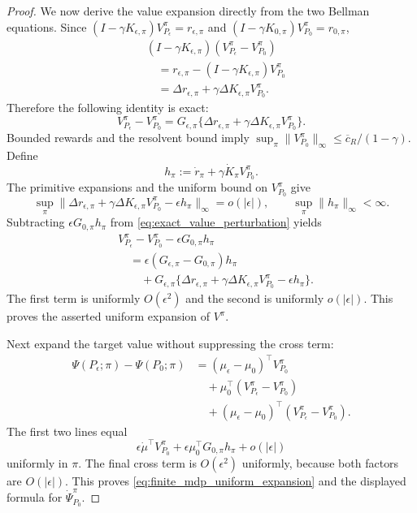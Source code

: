 \documentclass[12pt]{article}
\theoremstyle{remark}\newtheorem{remark}[theorem]{Remark}\theoremstyle{plain}
\begin{document}
\begin{proof}
    We now derive the value expansion directly from the two Bellman
    equations.  Since
    $(I-\gamma K_{\epsilon,\pi})V_{P_\epsilon}^\pi
      =r_{\epsilon,\pi}$ and
    $(I-\gamma K_{0,\pi})V_{P_0}^\pi=r_{0,\pi}$,
    \[
        \begin{aligned}
        &(I-\gamma K_{\epsilon,\pi})
        (V_{P_\epsilon}^\pi-V_{P_0}^\pi)\\
        &\quad=
        r_{\epsilon,\pi}
        -(I-\gamma K_{\epsilon,\pi})V_{P_0}^\pi\\
        &\quad=
        \Delta r_{\epsilon,\pi}
        +\gamma\Delta K_{\epsilon,\pi}V_{P_0}^\pi.
        \end{aligned}
    \]
    Therefore the following identity is exact:
    \begin{equation}\label{eq:exact_value_perturbation}
        V_{P_\epsilon}^\pi-V_{P_0}^\pi
        =
        G_{\epsilon,\pi}
        \{\Delta r_{\epsilon,\pi}
        +\gamma\Delta K_{\epsilon,\pi}V_{P_0}^\pi\}.
    \end{equation}
    Bounded rewards and the resolvent bound imply
    $\sup_\pi\|V_{P_0}^\pi\|_\infty
      \leq\overline c_R/(1-\gamma)$.
    Define
    \[
        h_\pi:=\dot r_\pi+\gamma\dot K_\pi V_{P_0}^\pi.
    \]
    The primitive expansions and the uniform bound on $V_{P_0}^\pi$
    give
    \[
        \sup_\pi
        \|\Delta r_{\epsilon,\pi}
        +\gamma\Delta K_{\epsilon,\pi}V_{P_0}^\pi
        -\epsilon h_\pi\|_\infty=o(|\epsilon|),
        \qquad
        \sup_\pi\|h_\pi\|_\infty<\infty.
    \]
    Subtracting $\epsilon G_{0,\pi}h_\pi$ from
    \eqref{eq:exact_value_perturbation} yields
    \[
        \begin{aligned}
        &V_{P_\epsilon}^\pi-V_{P_0}^\pi
        -\epsilon G_{0,\pi}h_\pi\\
        &\quad=
        \epsilon(G_{\epsilon,\pi}-G_{0,\pi})h_\pi\\
        &\qquad+
        G_{\epsilon,\pi}
        \{\Delta r_{\epsilon,\pi}
        +\gamma\Delta K_{\epsilon,\pi}V_{P_0}^\pi
        -\epsilon h_\pi\}.
        \end{aligned}
    \]
    The first term is uniformly $O(\epsilon^2)$ and the second is
    uniformly $o(|\epsilon|)$.  This proves the asserted uniform
    expansion of $V^\pi$.

    Next expand the target value without suppressing the cross term:
    \[
        \begin{aligned}
        \Psi(P_\epsilon;\pi)-\Psi(P_0;\pi)
        &=(\mu_\epsilon-\mu_0)^\top V_{P_0}^\pi\\
        &\quad+\mu_0^\top
        (V_{P_\epsilon}^\pi-V_{P_0}^\pi)\\
        &\quad+(\mu_\epsilon-\mu_0)^\top
        (V_{P_\epsilon}^\pi-V_{P_0}^\pi).
        \end{aligned}
    \]
    The first two lines equal
    \[
        \epsilon\dot\mu^\top V_{P_0}^\pi
        +\epsilon\mu_0^\top G_{0,\pi}h_\pi
        +o(|\epsilon|)
    \]
    uniformly in $\pi$.  The final cross term is
    $O(\epsilon^2)$ uniformly, because both factors are
    $O(|\epsilon|)$.  This proves
    \eqref{eq:finite_mdp_uniform_expansion} and the displayed formula
    for $\dot\Psi_{P_0}^\pi$.


\end{proof}
\end{document}
